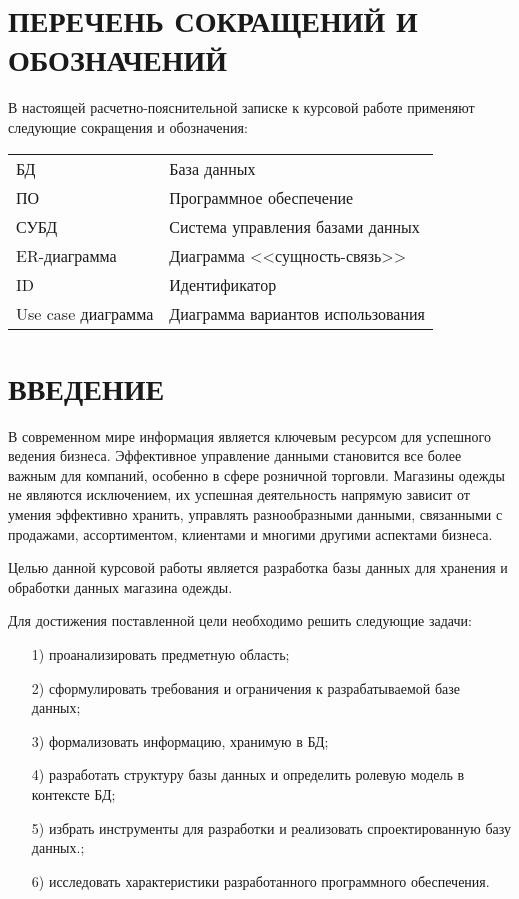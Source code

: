 \documentclass{bmstu}
\begin{document}
{\centering \maketableofcontents}

{\centering \chapter*{ПЕРЕЧЕНЬ СОКРАЩЕНИЙ И ОБОЗНАЧЕНИЙ}}

В настоящей расчетно-пояснительной записке к курсовой работе применяют следующие сокращения и обозначения:

\begin{table}[H]
\begin{tabular}{p{5cm}p{10.5cm}}
БД & База данных
\tabularnewline
ПО & Программное обеспечение
\tabularnewline
СУБД & Система управления базами данных
\tabularnewline
ER-диаграмма & Диаграмма <<сущность-связь>>
\tabularnewline
ID & Идентификатор
\tabularnewline
Use case диаграмма & Диаграмма вариантов использования
\tabularnewline
\end{tabular}
\end{table}

{\centering \chapter*{ВВЕДЕНИЕ}}

В современном мире информация является ключевым ресурсом для успешного ведения бизнеса. Эффективное управление данными становится все более важным для компаний, особенно в сфере розничной торговли. Магазины одежды не являются исключением, их успешная деятельность напрямую зависит от умения эффективно хранить, управлять разнообразными данными, связанными с продажами, ассортиментом, клиентами и многими другими аспектами бизнеса.

Целью данной курсовой работы является разработка базы данных для хранения и обработки данных магазина одежды.

Для достижения поставленной цели необходимо решить следующие задачи:
\begin{enumerate}
\item[1)] проанализировать предметную область;
\item[2)] сформулировать требования и ограничения к разрабатываемой базе данных;
\item[3)] формализовать информацию, хранимую в БД;
\item[4)] разработать структуру базы данных и определить ролевую модель в контексте БД;
\item[5)] избрать инструменты для разработки и реализовать спроектированную базу данных.;
\item[6)] исследовать характеристики разработанного программного обеспечения.
\end{enumerate}
\end{document}
